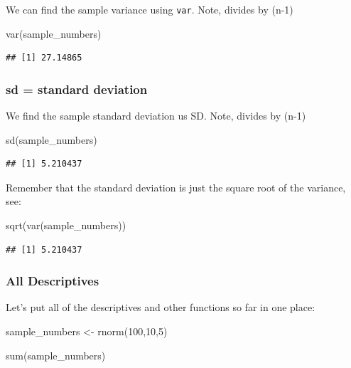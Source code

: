\documentclass[
]{book}
\newenvironment{Shaded}{\begin{snugshade}}{\end{snugshade}}
\newcommand{\DecValTok}[1]{\textcolor[rgb]{0.00,0.00,0.81}{#1}}
\newcommand{\FunctionTok}[1]{\textcolor[rgb]{0.00,0.00,0.00}{#1}}
\newcommand{\NormalTok}[1]{#1}
\newcommand{\OtherTok}[1]{\textcolor[rgb]{0.56,0.35,0.01}{#1}}
\begin{document}
We can find the sample variance using \texttt{var}. Note, divides by (n-1)

\begin{Shaded}
\begin{Highlighting}[]
\FunctionTok{var}\NormalTok{(sample\_numbers)}
\end{Highlighting}
\end{Shaded}

\begin{verbatim}
## [1] 27.14865
\end{verbatim}

\hypertarget{sd-standard-deviation}{%
\subsubsection{sd = standard deviation}\label{sd-standard-deviation}}

We find the sample standard deviation us SD. Note, divides by (n-1)

\begin{Shaded}
\begin{Highlighting}[]
\FunctionTok{sd}\NormalTok{(sample\_numbers)}
\end{Highlighting}
\end{Shaded}

\begin{verbatim}
## [1] 5.210437
\end{verbatim}

Remember that the standard deviation is just the square root of the variance, see:

\begin{Shaded}
\begin{Highlighting}[]
\FunctionTok{sqrt}\NormalTok{(}\FunctionTok{var}\NormalTok{(sample\_numbers))}
\end{Highlighting}
\end{Shaded}

\begin{verbatim}
## [1] 5.210437
\end{verbatim}

\hypertarget{all-descriptives}{%
\subsubsection{All Descriptives}\label{all-descriptives}}

Let's put all of the descriptives and other functions so far in one place:

\begin{Shaded}
\begin{Highlighting}[]
\NormalTok{sample\_numbers }\OtherTok{\textless{}{-}} \FunctionTok{rnorm}\NormalTok{(}\DecValTok{100}\NormalTok{,}\DecValTok{10}\NormalTok{,}\DecValTok{5}\NormalTok{)}

\FunctionTok{sum}\NormalTok{(sample\_numbers)}
\end{Highlighting}
\end{Shaded}
\end{document}
